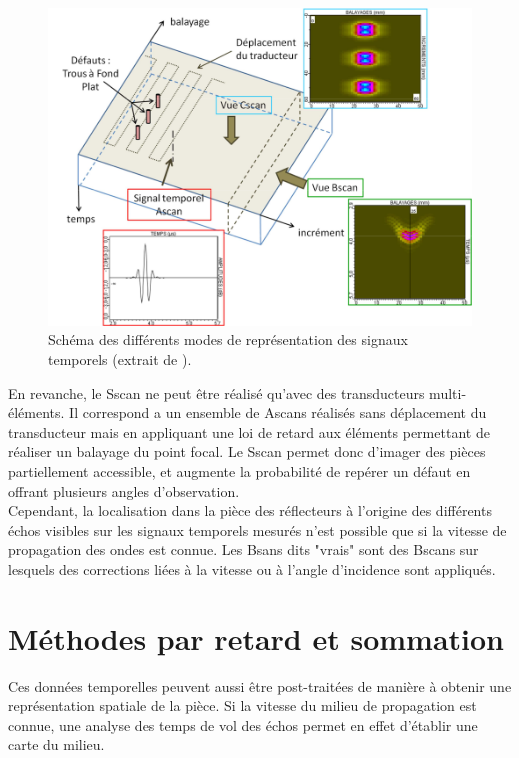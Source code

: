 
\begin{figure}
	\centering
	\includegraphics[scale=0.7]{img/scan2.png}
	\caption{\label{scan} Schéma des différents modes de représentation des signaux temporels (extrait de \cite{bannouf}).}
\end{figure}

En revanche, le Sscan ne peut être réalisé qu'avec des transducteurs multi-éléments. Il correspond a un ensemble de Ascans réalisés sans déplacement du transducteur mais en appliquant une loi de retard aux éléments permettant de réaliser un balayage du point focal. Le Sscan permet donc d'imager des pièces partiellement accessible, et augmente la probabilité de repérer un défaut en offrant plusieurs angles d'observation.\\

Cependant, la localisation dans la pièce des réflecteurs à l'origine des différents échos visibles sur les signaux temporels mesurés n'est possible que si la vitesse de propagation des ondes est connue. Les Bsans dits "vrais" sont des Bscans sur lesquels des corrections liées à la vitesse ou à l'angle d'incidence sont appliqués.


\section{Méthodes par retard et sommation}
Ces données temporelles peuvent aussi être post-traitées de manière à obtenir une représentation spatiale de la pièce. Si la vitesse du milieu de propagation est connue, une analyse des temps de vol des échos permet en effet d'établir une carte du milieu. \\

